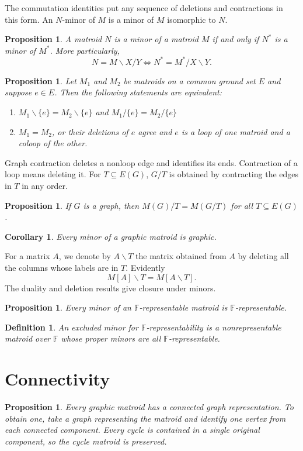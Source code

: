 \documentclass[11pt,letterpaper]{article}
\newcommand{\F}{\mathbb{F}}
\theoremstyle{appendix-result}
\newtheorem{proposition}[theorem]{Proposition}
\newtheorem{corollary}[theorem]{Corollary}
\theoremstyle{appendix-definition}
\newtheorem{definition}[theorem]{Definition}
\begin{document}
The commutation identities put any sequence of deletions and contractions in this form. An $N$-minor of $M$ is a minor of $M$ isomorphic to $N$.
\begin{proposition}
    A matroid $N$ is a minor of a matroid $M$ if and only if $N^*$ is a minor of $M^*$. More particularly,
    \[N = M \backslash X/Y \iff N^*=M^*/X\backslash Y.\]
\end{proposition}
\begin{proposition}
    Let $M_1$ and $M_2$ be matroids on a common ground set $E$ and suppose $e\in E$. Then the following statements are equivalent:
    \begin{enumerate}
        \item $M_1 \backslash \{e\} = M_2 \backslash \{e\}$ and $M_1/\{e\} = M_2/\{e\}$
        \item $M_1=M_2$, or their deletions of $e$ agree and $e$ is a loop of one matroid and a coloop of the other.
    \end{enumerate}
\end{proposition}
Graph contraction deletes a nonloop edge and identifies its ends. Contraction of a loop means deleting it. For $T\subseteq E(G)$, $G/T$ is obtained by contracting the edges in $T$ in any order.
\begin{proposition}
    If $G$ is a graph, then $M(G)/T = M(G/T)$ for all $T \subseteq E(G)$.
\end{proposition}
\begin{corollary}
    Every minor of a graphic matroid is graphic.
\end{corollary}
For a matrix $A$, we denote by $A \backslash T$ the matrix obtained from $A$ by deleting all the columns whose labels are in $T$. Evidently
\[M[A]\backslash T = M[A\backslash T].\]
The duality and deletion results give closure under minors.
\begin{proposition}
    Every minor of an $\F$-representable matroid is $\F$-representable.
\end{proposition}
\begin{definition}
    An excluded minor for $\F$-representability is a nonrepresentable matroid over $\F$ whose proper minors are all $\F$-representable.
\end{definition}
\section{Connectivity}
\begin{proposition}
    Every graphic matroid has a connected graph representation. To obtain one, take a graph representing the matroid and identify one vertex from each connected component. Every cycle is contained in a single original component, so the cycle matroid is preserved.
\end{proposition}
\end{document}
